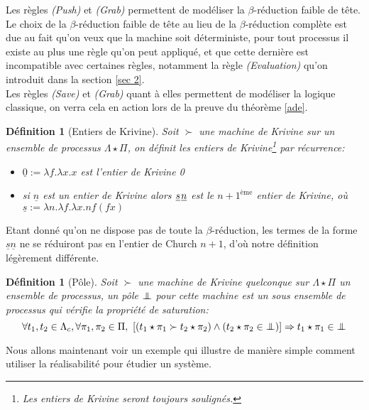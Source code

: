 \documentclass[a4paper,12pt]{article}
\newtheorem{defi}[theo]{Définition}
\theoremstyle{rmqstyle}
\renewcommand{\implies}{\Rightarrow}
\newcommand{\pole}{{\protect\mathpalette{\protect\polehelper}{\bot}}} \def\polehelper#1#2{\mathrel{\rlap{$#1#2$}\mkern3mu{#1#2}}}
\newcommand{\Kri}[1]{\underline{#1}}
\begin{document}
Les règles \textit{(Push)} et \textit{(Grab)} permettent de modéliser la $\beta$-réduction faible de tête. Le choix de la $\beta$-réduction faible de tête au lieu de la $\beta$-réduction complète est due au fait qu'on veux que la machine soit déterministe, pour tout processus il existe au plus une règle qu'on peut appliqué, et que cette dernière est incompatible avec certaines règles, notamment la règle \textit{(Evaluation)} qu'on introduit dans la section \ref{sec 2}.\\
Les règles \textit{(Save)} et \textit{(Grab)} quant à elles permettent de modéliser la logique classique, on verra cela en action lors de la preuve du théorème \ref{ade}.

\begin{defi}[Entiers de Krivine]
Soit $\succ$ une machine de Krivine sur un ensemble de processus $\Lambda \star \Pi$, on définit les entiers de Krivine\footnote{Les entiers de Krivine seront toujours soulignés.} par récurrence:
\begin{itemize}
\setlength\itemsep{ -1 em}
\item $\Kri{0} := \lambda f. \lambda x. x$ est l'entier de Krivine 0\\
\item si $\Kri{n}$ est un entier de Krivine alors $\Kri{s} \hspace{0.1 em} \Kri{n}$ est le $n+1^{\text{ème}}$ entier de Krivine, où $\Kri{s} := \lambda n. \lambda f. \lambda x. nf(fx)$
\end{itemize}
\end{defi}

Etant donné qu'on ne dispose pas de toute la $\beta$-réduction, les termes de la forme $\Kri{s} \Kri{n}$ ne se réduiront pas en l'entier de Church $n+1$, d'où notre définition légèrement différente.

\begin{defi}[Pôle]
Soit $\succ$ une machine de Krivine quelconque sur $\Lambda \star \Pi$ un ensemble de processus, un pôle $\pole$ pour cette machine est un sous ensemble de processus qui vérifie la propriété de saturation: $$\forall t_1, t_2 \in \Lambda_c, \forall \pi_1, \pi_2 \in \Pi, \ [(t_1 \star \pi_1 \succ t_2 \star \pi_2) \land  (t_2 \star \pi_2 \in \pole)] \implies t_1 \star \pi_1 \in \pole$$
\end{defi}

Nous allons maintenant voir un exemple qui illustre de manière simple comment utiliser la réalisabilité pour étudier un système. 

\clearpage
\end{document}
